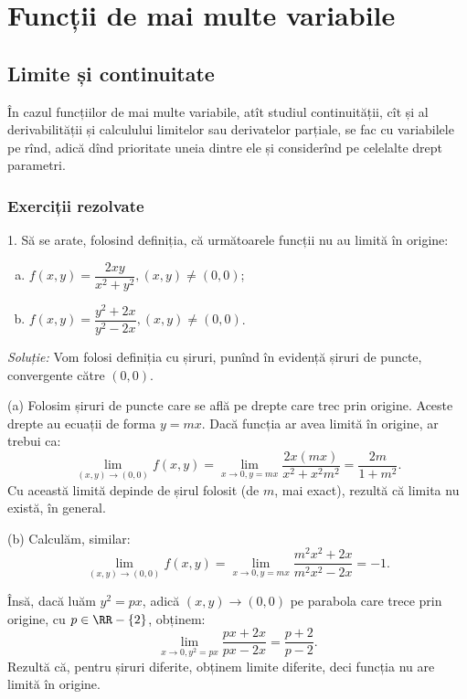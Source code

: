 \chapter{Funcții de mai multe variabile}

\section{Limite și continuitate}

În cazul funcțiilor de mai multe variabile, atît studiul continuității,
cît și al derivabilității și calculului limitelor sau derivatelor
parțiale, se fac cu variabilele pe rînd, adică dînd prioritate
uneia dintre ele și considerînd pe celelalte drept parametri.

\subsection{Exerciții rezolvate}

1. Să se arate, folosind definiția, că următoarele funcții nu au limită în origine:
\begin{enumerate}[(a)]
\item $f(x, y) = \dfrac{2xy}{x^2 + y^2}, (x, y) \neq (0, 0)$;
\item $f(x, y) = \dfrac{y^2 + 2x}{y^2 - 2x}, (x, y) \neq (0, 0)$.
\end{enumerate}

\emph{Soluție:} Vom folosi definiția cu șiruri, punînd în evidență șiruri de puncte,
convergente către $(0, 0)$.

(a) Folosim șiruri de puncte care se află pe drepte care trec prin origine. Aceste drepte
au ecuații de forma $y = mx$. Dacă funcția ar avea limită în origine, ar trebui ca:
\[
  \lim_{(x, y) \to (0, 0)} f(x, y) = \lim_{x \to 0, y = mx} \frac{2x(mx)}{x^2 + x^2 m^2} = %
  \frac{2m}{1 + m^2}.
\]
Cu această limită depinde de șirul folosit (de $m$, mai exact), rezultă că limita nu
există, în general.

(b) Calculăm, similar:
\[
  \lim_{(x, y) \to (0, 0)} f(x, y) = %
  \lim_{x \to 0, y = mx} \frac{m^2 x^2 + 2x}{m^2 x^2 - 2x} = -1.
\]

Însă, dacă luăm $y^2 = px$, adică $(x, y) \to (0, 0)$ pe parabola care trece prin origine,
cu $p \in \RR - \{2 \}$, obținem:
\[
  \lim_{x \to 0, y^2 = px} \frac{px + 2x}{px - 2x} = \frac{p + 2}{p - 2}.
\]
Rezultă că, pentru șiruri diferite, obținem limite diferite, deci funcția nu are limită
în origine.

\vspace{0.5cm}

